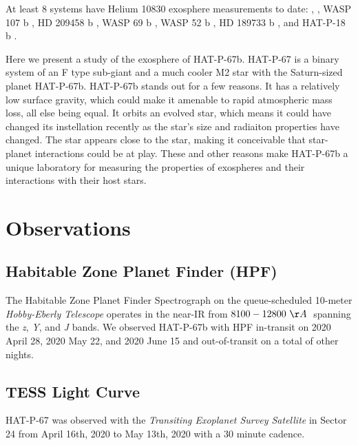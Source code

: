 \documentclass[twocolumn]{aastex631}
\begin{document}
At least 8 systems have Helium 10830 exosphere measurements to date:  \citep{2020ApJ...894...97N, 2021A&A...647A.129L},  \citep{2022AJ....163...68Z}, WASP 107 b \citep{2019A&A...623A..58A,2020AJ....159..115K}, HD 209458 b \citep{2019A&A...629A.110A}, WASP 69 b \citep{2020AJ....159..278V}, WASP 52 b \citep{2020AJ....159..278V}, HD 189733 b \citep{2021A&A...647A.129L}, and HAT-P-18 b \citep{2021ApJ...909L..10P}.


Here we present a study of the exosphere of HAT-P-67b.  HAT-P-67 is a binary system of an F type sub-giant and a much cooler M2 star with the Saturn-sized planet HAT-P-67b.  HAT-P-67b stands out for a few reasons.  It has a relatively low surface gravity, which could make it amenable to rapid atmospheric mass loss, all else being equal.  It orbits an evolved star, which means it could have changed its instellation recently as the star's size and radiaiton properties have changed.  The star appears close to the star, making it conceivable that star-planet interactions could be at play.  These and other reasons make HAT-P-67b a unique laboratory for measuring the properties of exospheres and their interactions with their host stars.

\section{Observations}
\subsection{Habitable Zone Planet Finder (HPF)}

The Habitable Zone Planet Finder Spectrograph \citep[HPF][]{2012SPIE.8446E..1SM,2014SPIE.9147E..1GM, 2019Optic...6..233M} on the queue-scheduled 10-meter \emph{Hobby-Eberly Telescope} \citep[HET][]{1998SPIE.3352...34R, 2007PASP..119..556S} operates in the near-IR from $8100-12800~\AA\;$ spanning the \textit{z}, \textit{Y}, and \textit{J} bands. We observed HAT-P-67b with HPF in-transit on 2020 April 28, 2020 May 22, and 2020 June 15 and out-of-transit on a total of  other nights.




\subsection{TESS Light Curve}
HAT-P-67 was observed with the \emph{Transiting Exoplanet Survey Satellite} \citep[TESS][]{2014SPIE.9143E..20R} in Sector 24 from April 16th, 2020 to May 13th, 2020 with a 30 minute cadence.
\end{document}
